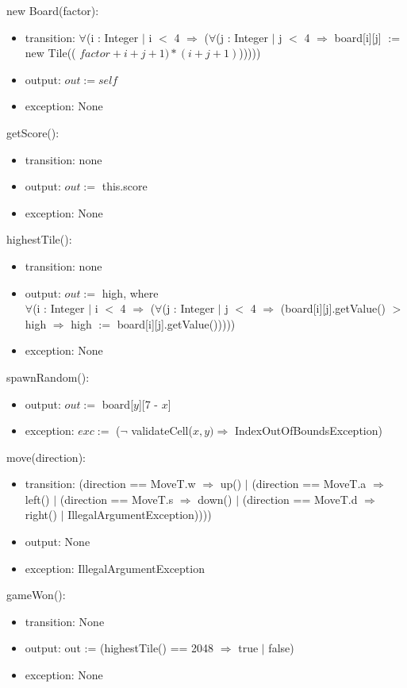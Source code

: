 \documentclass[12pt]{article}
\begin{document}
\noindent new Board(factor):
\begin{itemize}
\item transition: $\forall$(i : Integer $|$ i $<$ 4 $\Rightarrow$ ($\forall$(j : Integer $|$ j $<$ 4 $\Rightarrow$ board[i][j] $:=$ new Tile(( $factor + i + j + 1) * ( i + j + 1)$)))))
\item output: $out := \mathit{self}$
\item exception: None
\end{itemize}

\noindent getScore():
\begin{itemize}
\item transition: none
\item output: $out :=$ this.score
\item exception: None
\end{itemize}

\noindent highestTile():
\begin{itemize}
\item transition: none
\item output: $out :=$ high, where\\
$\forall$(i : Integer $|$ i $<$ 4 $\Rightarrow$ ($\forall$(j : Integer $|$ j $<$ 4 $\Rightarrow$ (board[i][j].getValue() $>$ high $\Rightarrow$ high $:=$ board[i][j].getValue()))))
\item exception: None
\end{itemize}

\noindent spawnRandom():
\begin{itemize}
\item output: $out :=$ board[$y$][7 - $x$]
\item exception: $exc :=$ ($\neg$ validateCell($x, y) \Rightarrow$ IndexOutOfBoundsException)
\end{itemize}

\noindent move(direction):
\begin{itemize}
\item transition: (direction == MoveT.w $\Rightarrow$  up() $|$ (direction == MoveT.a $\Rightarrow$  left() $|$ (direction == MoveT.s $\Rightarrow$  down() $|$ (direction == MoveT.d $\Rightarrow$  right() $|$ IllegalArgumentException))))
\item output: None
\item exception: IllegalArgumentException
\end{itemize}

\noindent gameWon():
\begin{itemize}
  \item transition: None
  \item output: out := (highestTile() == 2048 $\Rightarrow$ true $|$ false)
  \item exception: None
\end{itemize}
\end{document}

